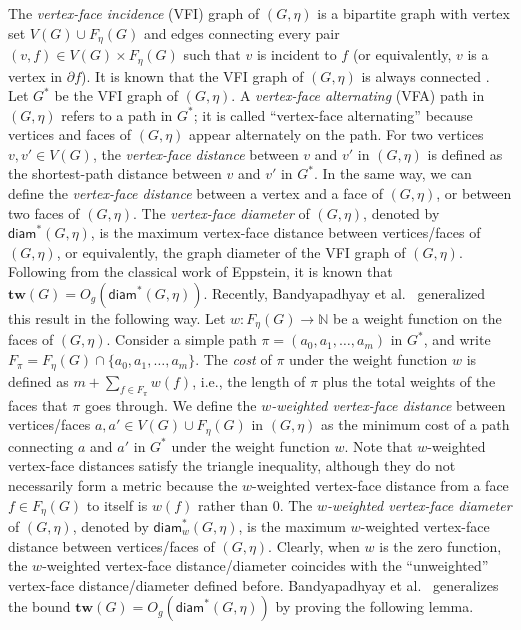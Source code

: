 \documentclass[a4paper,11pt]{article}
\numberwithin{lemma}{section}
\newcommand{\tw}{\mathbf{tw}}
\begin{document}
The \emph{vertex-face incidence} (VFI) graph of $(G,\eta)$ is a bipartite graph with vertex set $V(G) \cup F_\eta(G)$ and edges connecting every pair $(v,f) \in V(G) \times F_\eta(G)$ such that $v$ is incident to $f$ (or equivalently, $v$ is a vertex in $\partial f$).
It is known that the VFI graph of $(G,\eta)$ is always connected \cite{BandyapadhyayLLSJ22}.
Let $G^*$ be the VFI graph of $(G,\eta)$.
A \emph{vertex-face alternating} (VFA) path in $(G,\eta)$ refers to a path in $G^*$; it is called ``vertex-face alternating'' because vertices and faces of $(G,\eta)$ appear alternately on the path.
For two vertices $v,v' \in V(G)$, the \emph{vertex-face distance} between $v$ and $v'$ in $(G,\eta)$ is defined as the shortest-path distance between $v$ and $v'$ in $G^*$.
In the same way, we can define the \emph{vertex-face distance} between a vertex and a face of $(G,\eta)$, or between two faces of $(G,\eta)$.
The \emph{vertex-face diameter} of $(G,\eta)$, denoted by $\mathsf{diam}^*(G,\eta)$, is the maximum vertex-face distance between vertices/faces of $(G,\eta)$, or equivalently, the graph diameter of the VFI graph of $(G,\eta)$.
Following from the classical work \cite{Eppstein00} of Eppstein, it is known that $\tw(G) = O_g(\mathsf{diam}^*(G,\eta))$.
Recently, Bandyapadhyay et al.\ \cite{BandyapadhyayLLSJ22} generalized this result in the following way.
Let $w\colon F_\eta(G) \rightarrow \mathbb{N}$ be a weight function on the faces of $(G,\eta)$.
Consider a simple path $\pi = (a_0,a_1,\dots,a_m)$ in $G^*$, and write $F_\pi = F_\eta(G) \cap \{a_0,a_1,\dots,a_m\}$.
The \emph{cost} of $\pi$ under the weight function $w$ is defined as $m+\sum_{f \in F_\pi} w(f)$, i.e., the length of $\pi$ plus the total weights of the faces that $\pi$ goes through.
We define the \emph{$w$-weighted vertex-face distance} between vertices/faces $a,a' \in V(G) \cup F_\eta(G)$ in $(G,\eta)$ as the minimum cost of a path connecting $a$ and $a'$ in $G^*$ under the weight function $w$.
Note that $w$-weighted vertex-face distances satisfy the triangle inequality, although they do not necessarily form a metric because the $w$-weighted vertex-face distance from a face $f \in F_\eta(G)$ to itself is $w(f)$ rather than 0.
The \emph{$w$-weighted vertex-face diameter} of $(G,\eta)$, denoted by $\mathsf{diam}_w^*(G,\eta)$, is the maximum $w$-weighted vertex-face distance between vertices/faces of $(G,\eta)$.
Clearly, when $w$ is the zero function, the $w$-weighted vertex-face distance/diameter coincides with the ``unweighted'' vertex-face distance/diameter defined before.
Bandyapadhyay et al.\ \cite{BandyapadhyayLLSJ22} generalizes the bound $\tw(G) = O_g(\mathsf{diam}^*(G,\eta))$ by proving the following lemma.
\end{document}
